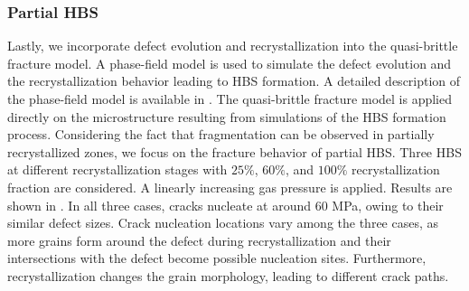 \subsubsection{Partial HBS}

Lastly, we incorporate defect evolution and recrystallization into the quasi-brittle fracture model. A phase-field model is used to simulate the defect evolution and the recrystallization behavior leading to HBS formation. A detailed description of the phase-field model is available in \cite{Aagesen2020}. The quasi-brittle fracture model is applied directly on the microstructure resulting from simulations of the HBS formation process. Considering the fact that fragmentation can be observed in partially recrystallized zones, we focus on the fracture behavior of partial HBS.
Three HBS at different recrystallization stages with $25\%$, $60\%$, and $100\%$ recrystallization fraction are considered. A linearly increasing gas pressure is applied. Results are shown in . In all three cases, cracks nucleate at around 60 MPa, owing to their similar defect sizes. Crack nucleation locations vary among the three cases, as more grains form around the defect during recrystallization and their intersections with the defect become possible nucleation sites. Furthermore, recrystallization changes the grain morphology, leading to different crack paths.

